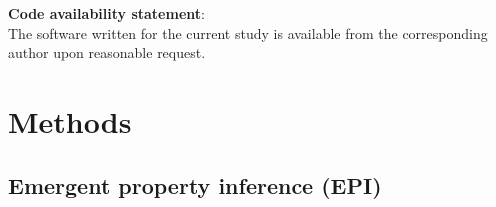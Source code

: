 \documentclass[11pt]{article}
\begin{document}
\textbf{Code availability statement}: \\
The software written for the current study is available from the corresponding author upon reasonable request.




\newpage 

\section{Methods}

\subsection{Emergent property inference (EPI)}\label{methods_EPI}
%
%
\end{document}
